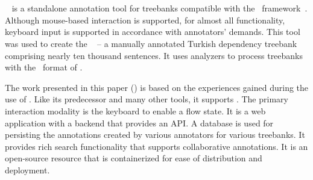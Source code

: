 \section{\boatvone}
\label{sec:vone}

\boatvone~\cite{turk-etal-2019-turkish} is a standalone annotation tool for treebanks compatible with the \ud\ framework~\cite{UD}.
Although mouse-based interaction is supported, for almost all functionality, keyboard input is supported in accordance with annotators' demands.
This tool was used to create the \bountreebank~\cite{turk2021resources,UD-Boun-Treebank} -- a manually annotated Turkish dependency treebank comprising nearly ten thousand sentences.
It uses analyzers to process treebanks with the \conllu\ format of \ud.

The work presented in this paper (\boatvtwo) is based on the experiences gained during the use of \boatvone.
Like its predecessor and many other tools, it supports \ud.
The primary interaction modality is the keyboard to enable a flow state.
It is a web application with a backend that provides an API.
A database is used for persisting the annotations created by various annotators for various treebanks.
It provides rich search functionality that supports collaborative annotations.
It is an open-source resource that is containerized for ease of distribution and deployment.
